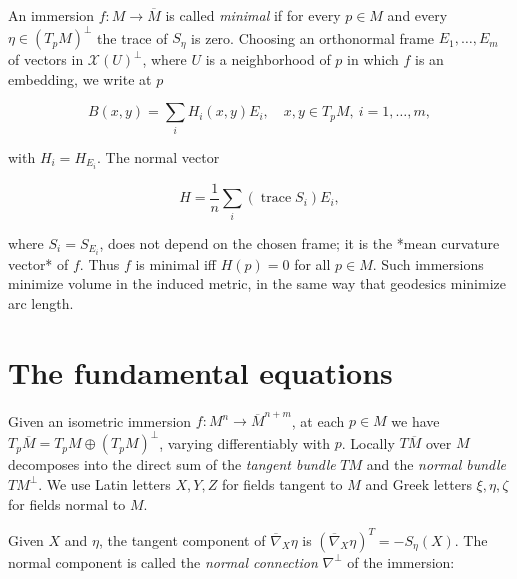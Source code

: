 \begin{definition}
  \label{def:dc-ch6-2-10}
  \leanok
  An immersion $f:M\to\overline{M}$ is called \emph{minimal} if for every $p\in M$ and
  every $\eta\in(T_pM)^\perp$ the trace of $S_\eta$ is zero. Choosing an orthonormal frame
  $E_1,\dots,E_m$ of vectors in $\mathcal{X}(U)^\perp$, where $U$ is a neighborhood
  of $p$ in which $f$ is an embedding, we write at $p$
  
  $$
  B(x,y)=\sum_i H_i(x,y)E_i,\quad x,y\in T_pM,\ i=1,\dots,m,
  $$
  
  with $H_i=H_{E_i}$. The normal vector
  
  $$
  H=\frac{1}{n}\sum_i(\operatorname{trace}S_i)E_i,
  $$
  
  where $S_i=S_{E_i}$, does not depend on the chosen frame; it is the *mean
  curvature vector* of $f$. Thus $f$ is minimal iff $H(p)=0$ for all $p\in M$. Such
  immersions minimize volume in the induced metric, in the same way that geodesics
  minimize arc length.
\end{definition}

\section{The fundamental equations}

Given an isometric immersion $f:M^n\to\overline{M}^{n+m}$, at each $p\in M$ we have
$T_p\overline{M}=T_pM\oplus(T_pM)^\perp$, varying differentiably with $p$. Locally
$T\overline{M}$ over $M$ decomposes into the direct sum of the \emph{tangent bundle}
$TM$ and the \emph{normal bundle} $TM^\perp$. We use Latin letters $X,Y,Z$ for fields
tangent to $M$ and Greek letters $\xi,\eta,\zeta$ for fields normal to $M$.

Given $X$ and $\eta$, the tangent component of $\overline{\nabla}_X\eta$ is
$(\overline{\nabla}_X\eta)^T=-S_\eta(X)$. The normal component is called the
\emph{normal connection} $\nabla^\perp$ of the immersion:

